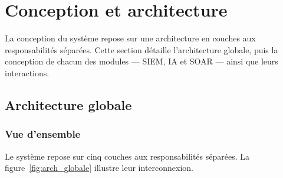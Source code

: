 \documentclass[12pt,a4paper]{report}
\begin{document}
\section{Conception et architecture}
\label{chap:conception}

La conception du système repose sur une architecture en couches
aux responsabilités séparées. Cette section détaille l'architecture
globale, puis la conception de chacun des modules — SIEM, IA et
SOAR — ainsi que leurs interactions.

\subsection{Architecture globale}

\subsubsection{Vue d'ensemble}

Le système repose sur cinq couches aux responsabilités séparées. La figure~\ref{fig:arch_globale} illustre leur interconnexion.
\end{document}

